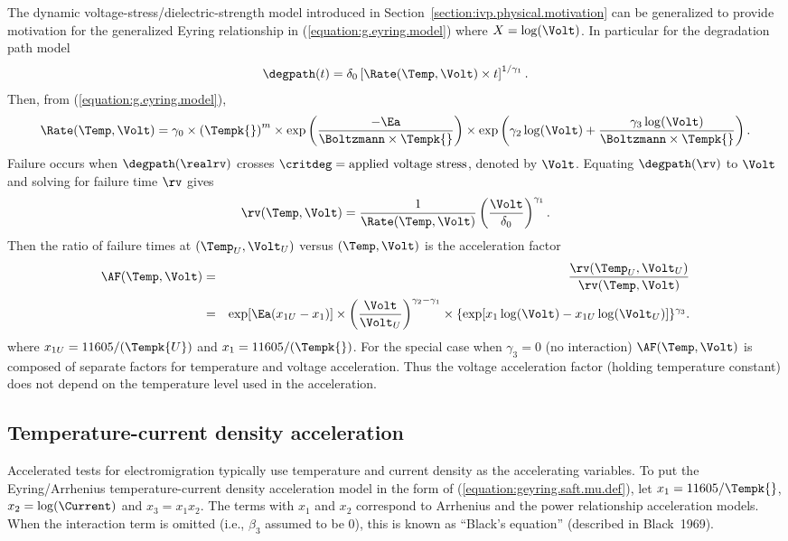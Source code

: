 The dynamic voltage-stress/dielectric-strength model introduced in
Section~\ref{section:ivp.physical.motivation} can be generalized to
provide motivation for the generalized Eyring relationship in
(\ref{equation:g.eyring.model}) where $X=\log(\Volt)$. In particular
for the degradation path model
\begin{displaymath}
\degpath(t) = \delta_{0} \left [\Rate(\Temp,\Volt) \times t \right ]
^{1/\gamma_{1}}.
\end{displaymath}
Then, from (\ref{equation:g.eyring.model}),
\begin{displaymath}
\Rate(\Temp,\Volt)=\gamma_{0} \times \left(\Tempk{}\right)^{m} \times \exp\left(
\frac{-\Ea}{\Boltzmann  \times \Tempk{}}\right) \times \exp\left(\gamma_{2} 
\log(\Volt) +
 \frac{\gamma_{3} \log(\Volt)}{\Boltzmann \times \Tempk{} }\right).
\end{displaymath}
Failure occurs
when $\degpath(\realrv)$ crosses $\critdeg = \mbox{applied voltage
stress}$, denoted by $\Volt$.  Equating $\degpath(\rv)$ to $\Volt$ and
solving for failure time $\rv$ gives
\begin{displaymath}
{\rv}(\Temp,\Volt) =\frac{1}{\Rate(\Temp,\Volt)} \left ( \frac{\Volt}{\delta_{0}} \right)^{\gamma_{1}}.
\end{displaymath}
Then the ratio of failure times
at $(\Temp_{U},\Volt_{U})$ versus $(\Temp,\Volt)$ 
is the acceleration factor
\begin{eqnarray*}
\AF(\Temp,\Volt)&=&
\frac{\rv(\Temp_{U},\Volt_{U})}
     {\rv(\Temp,\Volt)}\\
&=& \exp[\Ea ( x_{1U} -  x_{1} )] \times   
\left (  \frac{ \Volt}{  \Volt_{U} } \right) ^{\gamma_{2}-\gamma_{1}}\times 
\left \{ \exp[x_{1} \log(\Volt)- 
x_{1U}\log(\Volt_{U}) \right]\}^{\gamma_{3}} .
\end{eqnarray*}
where $x_{1U}=11605/(\Tempk{U})$ and $x_{1}=11605/(\Tempk{})$.  For
the special case when $\gamma_{3}=0$ (no interaction) $\AF(\Temp,\Volt)$
is composed of separate factors for temperature and voltage
acceleration. Thus the voltage acceleration factor (holding
temperature constant) does not depend on the temperature level used in
the acceleration.

\subsection{Temperature-current density acceleration}
Accelerated tests for electromigration typically use temperature and
current density as the accelerating variables.  To put the
Eyring/Arrhenius temperature-current density acceleration model in the
form of (\ref{equation:geyring.saft.mu.def}), let
$x_{1}=11605/\Tempk{}$, $x_{2}=\log(\Current)$ and $x_{3}=x_{1}x_{2}$.
The terms with $x_{1}$ and $x_{2}$ correspond to Arrhenius and the
power relationship acceleration models. When the interaction term is omitted
(i.e., $\beta_{3}$ assumed to be 0), this is known as ``Black's
equation'' (described in Black~1969).

